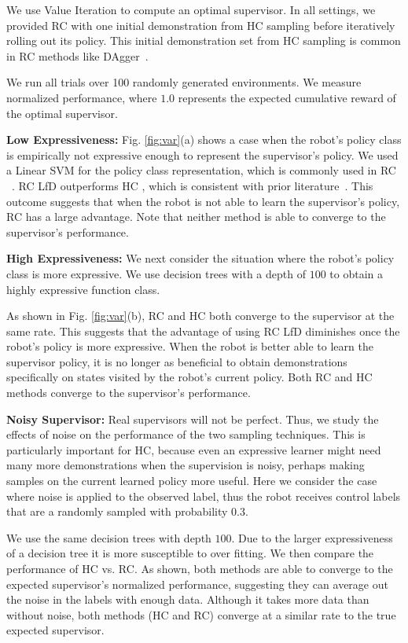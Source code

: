 \documentclass[10pt, conference]{ieeeconf}      %
\begin{document}
We use Value Iteration to compute an optimal supervisor. In all settings, we provided RC with one initial demonstration from HC sampling before iteratively rolling out its policy. This initial demonstration set from HC sampling is common in RC methods like DAgger~\cite{ross2010reduction}.

We run all trials over 100 randomly generated environments.
We measure normalized performance, where $1.0$ represents the expected cumulative reward of the optimal supervisor.

\noindent \textbf{Low Expressiveness:} Fig. \ref{fig:var}(a) shows a case when the robot's policy class is empirically not expressive enough to represent the supervisor's policy.
We used a Linear SVM for the policy class representation, which is commonly used in RC ~\cite{ross2010efficient,ross2010reduction,ross2013learning}. RC LfD outperforms HC , which is consistent with prior literature~\cite{ross2010efficient,ross2010reduction}.
This outcome suggests that when the robot is not able to learn the supervisor's policy, RC has a large advantage. Note that neither method is able to converge to the supervisor's performance. 

\noindent \textbf{High Expressiveness:}
We next consider the situation where the robot's policy class is more expressive. We use decision trees with a depth of $100$ to obtain a highly expressive function class. 

As shown in Fig. \ref{fig:var}(b), RC and HC both converge to the supervisor at the same rate. This suggests that the advantage of using RC LfD diminishes once the robot's policy is more expressive. When the robot is better able to learn the supervisor policy, it is no longer as beneficial to obtain demonstrations specifically on states visited by the robot's current policy. Both RC and HC methods converge to the supervisor's performance. 


\noindent \textbf{Noisy Supervisor:}
Real supervisors will not be perfect. Thus, we study the effects of noise on the performance of the two sampling techniques. This is particularly important for HC, because even an expressive learner might need many more demonstrations when the supervision is noisy, perhaps making samples on the current learned policy more useful. Here we consider the case where noise is applied to the observed label, thus the robot receives control labels that are  a randomly sampled with probability $0.3$.

We use the same decision trees with depth $100$. Due to the larger expressiveness of a decision tree it is more susceptible to over fitting.  We then compare the performance of HC vs. RC. As shown, both methods are able to converge to the expected supervisor's normalized performance, suggesting they can average out the noise in the labels with enough data. Although it takes more data than without noise, both methods (HC and RC) converge at a similar rate to the true expected supervisor. 
\end{document}
